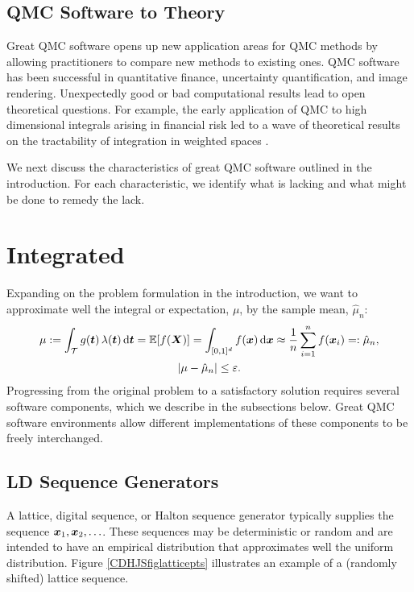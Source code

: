 \documentclass[graybox]{svmult}
\begin{document}
\subsection{QMC Software to Theory}

Great QMC software opens up new application areas for QMC methods by allowing practitioners to compare new methods to existing ones.  QMC software has been successful in quantitative finance, uncertainty quantification, and image rendering. Unexpectedly good or bad computational results lead to open theoretical questions.  For example, the early application of QMC to high dimensional integrals arising in financial risk \cite{PasTra95} led to a wave of theoretical results on the tractability of integration in weighted spaces \cite{Woz99a,DicEtal14a,NovWoz10a}.

We next discuss the characteristics of great QMC software outlined in the introduction.  For each characteristic, we identify what is lacking and what might be done to remedy the lack.

\section{Integrated} \label{CDHJS_sec:integrated}

Expanding on the problem formulation in the introduction, we want to approximate well the integral or expectation, $\mu$, by the sample mean, $\hat{\mu}_n$:
\begin{gather}
\label{eq:cubSummary}
	\mu : = \int_\calT g(\bst) \, \lambda(\bst) \, \D \bst  = \bbE[f(\bsX)] = \int_{[0,1]^d} f(\bsx)  \, \D \bsx \approx \frac 1n \sum_{i=1}^{n} f(\bsx_i) =: \hat{\mu}_n, \\
 \label{CDHJS_eq:error_tol}
 \abs{\mu - \hat{\mu}_n} \le \varepsilon.
\end{gather}
Progressing from the original problem to a satisfactory solution requires several software components, which we describe in the subsections below.  Great QMC software environments allow different implementations of these components to be freely interchanged.

\subsection{LD Sequence Generators} A lattice, digital sequence, or Halton sequence generator typically supplies the sequence ${\boldsymbol{x}}_1, {\boldsymbol{x}}_2, \ldots$.  These sequences may be deterministic or random and are intended to have an empirical distribution that approximates well the uniform distribution.  Figure \ref{CDHJSfiglatticepts} illustrates an example of a (randomly shifted) lattice sequence.
\end{document}
